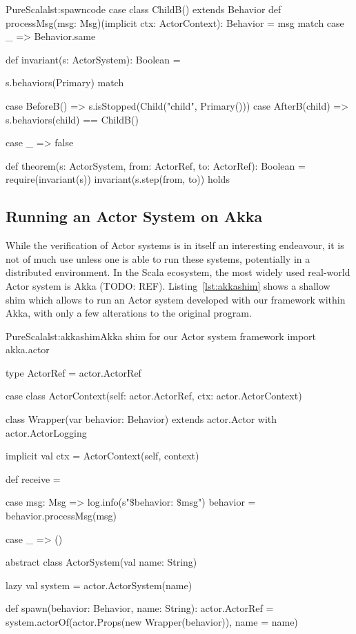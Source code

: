\documentclass[a4paper,twoside]{article}
\newcommand{\TODO}[1]{\textcolor{YellowOrange}{(TODO: #1)}} %
\newcommand{\RefCode}[1]{Listing~\ref{#1}}
\begin{document}
\begin{enumerate}
\begin{Code}{PureScala}{lst:spawncode}{}
case class ChildB() extends Behavior {
  def processMsg(msg: Msg)(implicit ctx: ActorContext): Behavior = msg match {
    case _ => Behavior.same
  }
}

def invariant(s: ActorSystem): Boolean = {
  s.behaviors(Primary) match {
    case BeforeB() =>
      s.isStopped(Child("child", Primary()))
    case AfterB(child) =>
      s.behaviors(child) == ChildB()

    case _ => false
  }
}

def theorem(s: ActorSystem, from: ActorRef, to: ActorRef): Boolean = {
  require(invariant(s))
  invariant(s.step(from, to))
} holds
\end{Code}

\subsection{Running an Actor System on Akka}
\label{akka}

While the verification of Actor systems is in itself an interesting endeavour, it is not of much use unless one is able to run these systems, potentially in a distributed environment. In the Scala ecosystem, the most widely used real-world Actor system is Akka \TODO{REF}. \RefCode{lst:akkashim} shows a shallow shim which allows to run an Actor system developed with our framework within Akka, with only a few alterations to the original program.

\begin{Code}{PureScala}{lst:akkashim}{Akka shim for our Actor system framework}
import akka.actor

type ActorRef = actor.ActorRef

case class ActorContext(self: actor.ActorRef, ctx: actor.ActorContext)

class Wrapper(var behavior: Behavior)
  extends actor.Actor with actor.ActorLogging {

  implicit val ctx = ActorContext(self, context)

  def receive = {
    case msg: Msg =>
      log.info(s"$\$${behavior}: $\$${msg}")
      behavior = behavior.processMsg(msg)

    case _ => ()
  }
}

abstract class ActorSystem(val name: String) {
  lazy val system = actor.ActorSystem(name)

  def spawn(behavior: Behavior, name: String): actor.ActorRef = {
    system.actorOf(actor.Props(new Wrapper(behavior)), name = name)
  }

}
\end{Code}
\end{enumerate}
\end{document}
